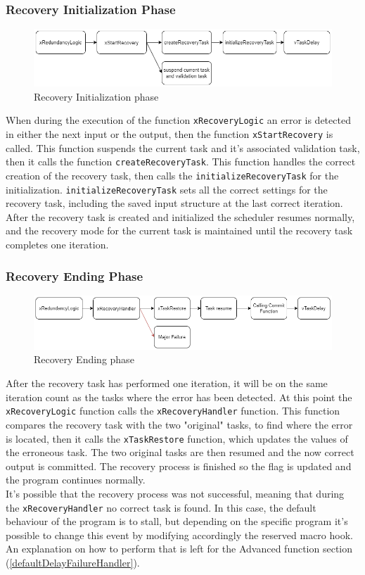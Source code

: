 \documentclass[a4paper, 12pt]{article}
\begin{document}
\begin{onehalfspace}
\subsubsection{Recovery Initialization Phase}\label{recovery_init_phase}
\begin{figure}[h]
\includegraphics[width=\textwidth]{images/recovery init phase.png}
\caption{Recovery Initialization phase}
\end{figure}
When during the execution of the function \texttt{xRecoveryLogic} an error is detected in either the next input or the output, then the function \texttt{xStartRecovery} is called. This function suspends the current task and it's associated validation task, then it calls the function \texttt{createRecoveryTask}. This function handles the correct creation of the recovery task, then calls the \texttt{initializeRecoveryTask} for the initialization. \texttt{initializeRecoveryTask} sets all the correct settings for the recovery task, including the saved input structure at the last correct iteration. After the recovery task is created and initialized the scheduler resumes normally, and the recovery mode for the current task is maintained until the recovery task completes one iteration.
\subsubsection{Recovery Ending Phase}\label{recovery_end_phase}
\begin{figure}[h]
\includegraphics[width=\textwidth]{images/recovery end phase.png}
\caption{Recovery Ending phase}
\end{figure}
After the recovery task has performed one iteration, it will be on the same iteration count as the tasks where the error has been detected. At this point the \texttt{xRecoveryLogic} function calls the \texttt{xRecoveryHandler} function. This function compares the recovery task with the two "original" tasks, to find where the error is located, then it calls the \texttt{xTaskRestore} function, which updates the values of the erroneous task. The two original tasks are then resumed and the now correct output is committed. The recovery process is finished so the flag is updated and the program continues normally.\\
It's possible that the recovery process was not successful, meaning that during the \texttt{xRecoveryHandler} no correct task is found. In this case, the default behaviour of the program is to stall, but depending on the specific program it's possible to change this event by modifying accordingly the reserved macro hook. An explanation on how to perform that is left for the Advanced function section (\ref{defaultDelayFailureHandler}).

\end{onehalfspace}
\end{document}

